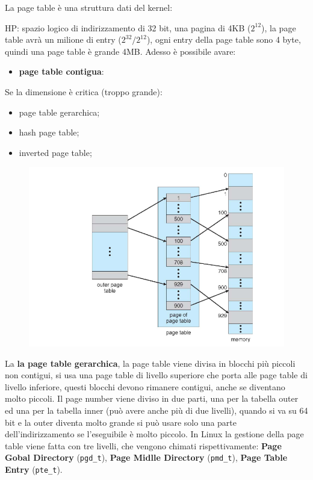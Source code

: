 \documentclass[12pt]{article}
\begin{document}
La page table \`e una struttura dati del kernel:
\begin{example}{}{}
  HP: spazio logico di indirizzamento di 32 bit, una pagina di 4KB ($2^{12}$), la page table avr\`a un milione di entry ($2^{32}/2^{12}$), ogni entry della page table sono 4 byte, quindi una page table \`e grande 4MB. Adesso \`e possibile avare:
  \begin{itemize}
    \item \textbf{page table contigua}:
  \end{itemize}
  Se la dimensione \`e critica (troppo grande):
    \begin{itemize}
      \item page table gerarchica;
      \item hash page table;
      \item inverted page table;
    \end{itemize}
\end{example}

\hfill

\begin{figure}
  \centering
  \includegraphics[width=1\linewidth]{page-table-gerarchica.png}
\end{figure}
La \textbf{la page table gerarchica}, la page table viene divisa in blocchi pi\`u piccoli non contigui, si usa una page table di livello superiore che porta alle page table di livello inferiore, questi blocchi devono rimanere contigui, anche se diventano molto piccoli. Il page number viene diviso in due parti, una per la tabella outer ed una per la tabella inner (pu\`o avere anche pi\`u di due livelli), quando si va su 64 bit e la outer diventa molto grande si pu\`o usare solo una parte dell'indirizzamento se l'eseguibile \`e molto piccolo. In Linux la gestione della page table viene fatta con tre livelli, che vengono chimati rispettivamente: \textbf{Page Gobal Directory} (\texttt{pgd\_t}), \textbf{Page Midlle Directory} (\texttt{pmd\_t}), \textbf{Page Table Entry} (\texttt{pte\_t}).
\end{document}
